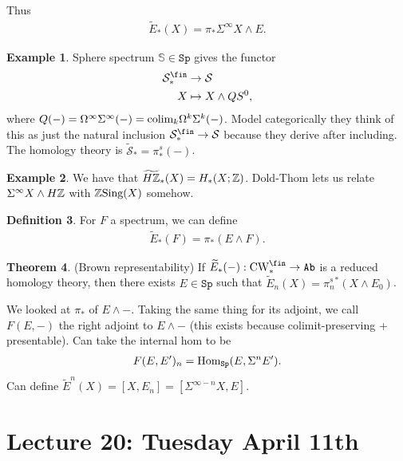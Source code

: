 \documentclass[12pt]{amsart}
\let\til\widetilde
\theoremstyle{definition}
\newtheorem{theorem}{Theorem}[section]
\newtheorem{definition}[theorem]{Definition}
\newtheorem{example}[theorem]{Example}
\let\smashprod\wedge
\providecommand{\Sp}{\texttt{Sp}}
\providecommand{\Sp}{\text{Sp}}
\providecommand{\CW}{\text{CW}}
\begin{document}
Thus
\begin{align*}
    \til{E}_\ast(X) = \pi_\ast \Sigma^\infty X \smashprod E.
\end{align*}

\begin{example} Sphere spectrum $\mathbb{S} \in \Sp$ gives the functor
\begin{align*}
    \mathcal{S}_\ast^\fin &\to \mathcal{S} \\
    X &\mapsto X \smashprod QS^0,
\end{align*}
where $Q(-) = \Omega^\infty \Sigma^\infty(-) = \text{colim}_k \Omega^k \Sigma^k(-)$. Model categorically they think of this as just the natural inclusion $\mathcal{S}_\ast^\fin \to \mathcal{S}$ because they derive after including. The homology theory is $\widetilde{\mathcal{S}}_\ast = \pi_\ast^s(-)$.
\end{example}

\begin{example} We have that $\widetilde{H\mathbb{Z}}_\ast(X) = H_\ast(X;\mathbb{Z})$. Dold-Thom lets us relate $\Sigma^\infty X \smashprod H\Z$ with $\mathbb{Z}\text{Sing}(X)$ somehow.
\end{example}

\begin{definition} For $F$ a spectrum, we can define
\begin{align*}
    \til{E}_\ast(F) = \pi_\ast(E \smashprod F).
\end{align*}
\end{definition}

\begin{theorem} (Brown representability) If $\til{E}_\ast(-): \CW_\ast^\fin \to \Ab$ is a reduced homology theory, then there exists $E\in \Sp$ such that $\til{E}_n(X) = \pi_n^s^\ast(X \smashprod E_0)$.
\end{theorem}

We looked at $\pi_\ast$ of $E \smashprod -$. Taking the same thing for its adjoint, we call $F(E,-)$ the right adjoint to $E \smashprod -$ (this exists because colimit-preserving + presentable). Can take the internal hom to be
\begin{align*}
    F(E,E')_n = \Hom_\Sp(E, \Sigma^n E').
\end{align*}
Can define $\til{E}^n(X) = [X,E_n] = [\Sigma^{\infty-n} X,E]$.

\section{Lecture 20: Tuesday April 11th}
\end{document}
